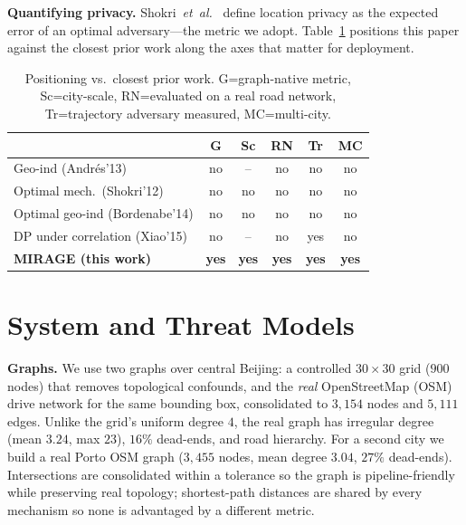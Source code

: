 \documentclass[11pt]{article}
\begin{document}
\textbf{Quantifying privacy.} Shokri~\emph{et~al.}~\cite{shokri2011} define
location privacy as the expected error of an optimal adversary---the metric we
adopt. Table~\ref{tab:related} positions this paper against the closest prior
work along the axes that matter for deployment.

\begin{table}[t]\centering
\caption{Positioning vs.\ closest prior work. G=graph-native metric,
Sc=city-scale, RN=evaluated on a real road network, Tr=trajectory adversary
measured, MC=multi-city.}
\label{tab:related}
\begin{tabular}{lccccc}
\toprule
 & G & Sc & RN & Tr & MC \\
\midrule
Geo-ind (Andr\'{e}s'13) \cite{andres2013}          & no  & --  & no  & no  & no \\
Optimal mech.\ (Shokri'12) \cite{shokri2012}        & no  & no  & no  & no  & no \\
Optimal geo-ind (Bordenabe'14) \cite{bordenabe2014} & no  & no  & no  & no  & no \\
DP under correlation (Xiao'15) \cite{xiao2015}       & no  & --  & no  & yes & no \\
\textbf{MIRAGE (this work)}                          & \textbf{yes} & \textbf{yes} & \textbf{yes} & \textbf{yes} & \textbf{yes} \\
\bottomrule
\end{tabular}
\end{table}

\section{System and Threat Models}
\label{sec:sysmodel}
\textbf{Graphs.} We use two graphs over central Beijing: a controlled
$30\times30$ grid ($900$ nodes) that removes topological confounds, and the
\emph{real} OpenStreetMap (OSM) drive network for the same bounding box,
consolidated to $3{,}154$ nodes and $5{,}111$ edges. Unlike the grid's uniform
degree $4$, the real graph has irregular degree (mean $3.24$, max $23$), $16\%$
dead-ends, and road hierarchy. For a second city we build a real Porto OSM graph
($3{,}455$ nodes, mean degree $3.04$, $27\%$ dead-ends). Intersections are
consolidated within a tolerance so the graph is pipeline-friendly while
preserving real topology; shortest-path distances are shared by every mechanism
so none is advantaged by a different metric.
\end{document}
